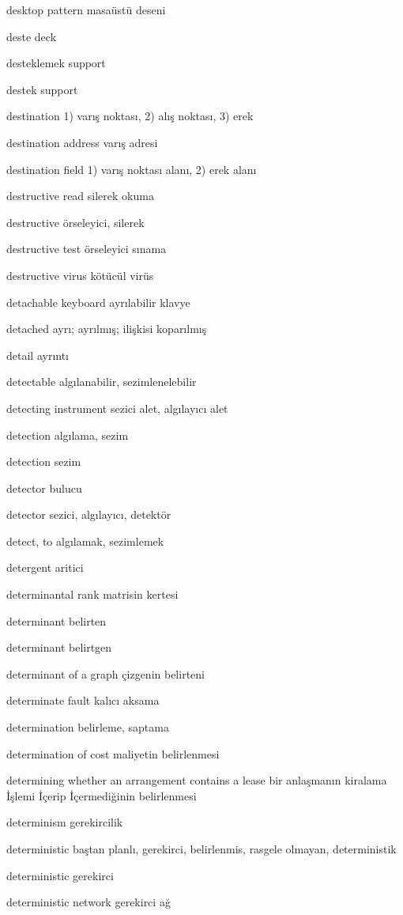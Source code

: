 \documentclass[12pt,fleqn]{article}\usepackage{../../common}
\begin{document}
desktop pattern masaüstü deseni

deste deck

desteklemek support

destek support

destination 1) varış noktası, 2) alış noktası, 3) erek

destination address varış adresi

destination field 1) varış noktası alanı, 2) erek alanı

destructive read silerek okuma

destructive örseleyici, silerek

destructive test örseleyici sınama

destructive virus kötücül virüs

detachable keyboard ayrılabilir klavye

detached ayrı; ayrılmış; ilişkisi koparılmış

detail ayrıntı

detectable algılanabilir, sezimlenelebilir

detecting instrument sezici alet, algılayıcı alet

detection algılama, sezim

detection sezim

detector bulucu

detector sezici, algılayıcı, detektör

detect, to algılamak, sezimlemek

detergent aritici

determinantal rank matrisin kertesi

determinant belirten

determinant belirtgen

determinant of a graph çizgenin belirteni

determinate fault kalıcı aksama

determination belirleme, saptama

determination of cost maliyetin belirlenmesi

determining whether an arrangement contains a lease bir anlaşmanın kiralama İşlemi İçerip İçermediğinin belirlenmesi

determinism gerekircilik

deterministic baştan planlı, gerekirci, belirlenmis, rasgele olmayan, deterministik

deterministic gerekirci

deterministic network gerekirci ağ
\end{document}
